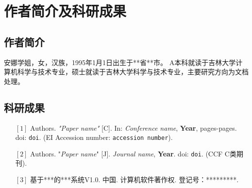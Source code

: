 \chapter{作者简介及科研成果}
\section*{作者简介}
安娜学姐，女，汉族，1995年1月1日出生于**省**市。
A本科就读于吉林大学计算机科学与技术专业，硕士就读于吉林大学科学与技术专业，主要研究方向为文档处理。

\section*{科研成果}
\vskip 10pt
\begin{itemize}[itemsep= 7pt, labelsep= 10pt, leftmargin = 25pt, topsep = 10pt]
	\small
	\setlength{\baselineskip}{16pt}
	\item[{$\left[1\right]$}]
	Authors. \textit{"Paper name"} [C]. In: \textit{Conference name}, \textbf{Year}, pages-pages.  doi: \texttt{doi}. (EI Accession number: \texttt{accession number}).
	
	\item[{$\left[2\right]$}]
	Authors. "\textit{Paper name}" [J]. \textit{Journal name}, \textbf{Year}. doi: \texttt{doi}. (CCF C类期刊).
	
	\item[{$\left[3\right]$}]
	基于***的***系统V1.0. 中国. 计算机软件著作权. 登记号：*********.
\end{itemize}